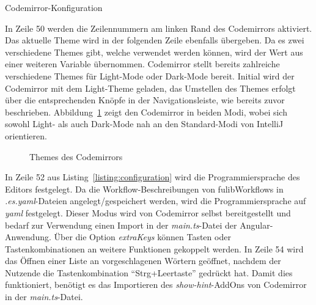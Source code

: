 \begin{listing}[!ht]
    \inputminted[firstnumber=49]{ts}{listings/3.2/codemirror-options.ts}
    \caption{Codemirror-Konfiguration}
    \label{listing:configuration}
\end{listing}

In Zeile 50 werden die Zeilennummern am linken Rand des Codemirrors aktiviert.
Das aktuelle Theme wird in der folgenden Zeile ebenfalls übergeben.
Da es zwei verschiedene Themes gibt, welche verwendet werden können, wird der Wert aus einer weiteren Variable übernommen.
Codemirror stellt bereits zahlreiche verschiedene Themes für Light-Mode oder Dark-Mode bereit.
Initial wird der Codemirror mit dem Light-Theme geladen, das Umstellen des Themes erfolgt über die entsprechenden Knöpfe in der Navigationsleiste, wie bereits zuvor beschrieben.
Abbildung~\ref{fig:themes} zeigt den Codemirror in beiden Modi, wobei sich sowohl Light- als auch Dark-Mode nah an den Standard-Modi von IntelliJ orientieren.

\begin{figure}[h]
    \centering
    \qquad
    \caption{Themes des Codemirrors}
    \label{fig:themes}
\end{figure}

In Zeile 52 aus Listing~\ref{listing:configuration} wird die Programmiersprache des Editors festgelegt.
Da die Workflow-Beschreibungen von fulibWorkflows in \textit{.es.yaml}-Dateien angelegt/gespeichert werden, wird die Programmiersprache auf \textit{yaml} festgelegt.
Dieser Modus wird von Codemirror selbst bereitgestellt und bedarf zur Verwendung einen Import in der \textit{main.ts}-Datei der Angular-Anwendung.
Über die Option \textit{extraKeys} können Tasten oder Tastenkombinationen an weitere Funktionen gekoppelt werden.
In Zeile 54 wird das Öffnen einer Liste an vorgeschlagenen Wörtern geöffnet, nachdem der Nutzende die Tastenkombination ``Strg+Leertaste'' gedrückt hat.
Damit dies funktioniert, benötigt es das Importieren des \textit{show-hint}-AddOns von Codemirror in der \textit{main.ts}-Datei.

